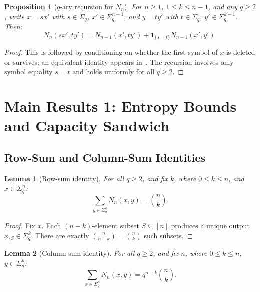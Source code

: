 \documentclass[conference]{IEEEtran}
\newtheorem{lemma}{Lemma}
\newtheorem{proposition}{Proposition}
\begin{document}
\begin{proposition}[$q$-ary recursion for $N_n$]
\label{thm:recursion}
For $n\ge 1$, $1\le k\le n-1$, and any $q\ge 2$, write $x=sx'$ with
$s\in\Sigma_q$, $x'\in\Sigma_q^{n-1}$, and $y=ty'$ with $t\in\Sigma_q$,
$y'\in\Sigma_q^{k-1}$.  Then:
\begin{equation}
  N_n(sx',ty')=N_{n-1}(x',ty')+\mathbf{1}_{\{s=t\}}N_{n-1}(x',y').
  \label{eq:rec}
\end{equation}
\end{proposition}
\begin{proof}
This is followed by conditioning
on whether the first symbol of $x$ is deleted or survives; an equivalent
identity appears in~\cite{mitzenmacher2009}. The recursion involves only
symbol equality $s=t$ and holds uniformly for all $q\ge 2$.
\end{proof}


\section{Main Results 1: Entropy Bounds and Capacity Sandwich}
\label{sec:bounds}


\subsection{Row-Sum and Column-Sum Identities}

\begin{lemma}[Row-sum identity]
\label{lem:rowsum}
For all $q\ge 2$, and fix \(k\), where $0\le k\le n$, and $x\in\Sigma_q^n$:
\begin{equation}
  \sum_{y\in\Sigma_q^k}N_n(x,y)=\binom{n}{k}.
  \label{eq:rowsum}
\end{equation}
\end{lemma}

\begin{proof}
Fix $x$.  Each $(n-k)$-element subset $S\subseteq[n]$ produces a
unique output $x_{\setminus S}\in\Sigma_q^k$.  There are exactly
$\binom{n}{n-k}=\binom{n}{k}$ such subsets.
\end{proof}

\begin{lemma}[Column-sum identity]
\label{lem:colsum}
For all $q\ge 2$, and fix \(n\), where $0\le k\le n$, $y\in\Sigma_q^k$:
\begin{equation}
  \sum_{x\in\Sigma_q^n}N_n(x,y)=q^{n-k}\binom{n}{k}.
  \label{eq:colsum}
\end{equation}
\end{lemma}
\end{document}
